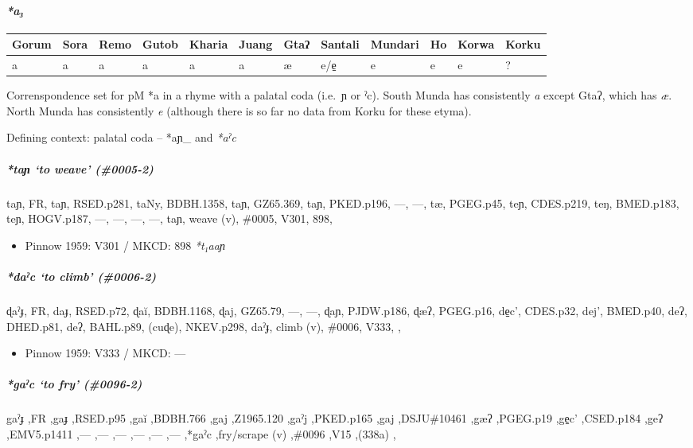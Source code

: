 \documentclass[a4paper,]{article}
\providecommand{\tightlist}{%
  \setlength{\itemsep}{0pt}\setlength{\parskip}{0pt}}
\let\oldparagraph\paragraph
\renewcommand{\paragraph}[1]{\oldparagraph{#1}\mbox{}}
\let\oldsubparagraph\subparagraph
\renewcommand{\subparagraph}[1]{\oldsubparagraph{#1}\mbox{}}
\begin{document}
\paragraph{\texorpdfstring{\emph{*a₃}}{*a₃}}\label{a-2}

\begin{longtable}[]{@{}llllllllllll@{}}
\toprule
Gorum & Sora & Remo & Gutob & Kharia & Juang & Gtaʔ & Santali & Mundari
& Ho & Korwa & Korku\tabularnewline
\midrule
\endhead
a & a & a & a & a & a & æ & e/e̠ & e & e & e & ?\tabularnewline
\bottomrule
\end{longtable}

Correnspondence set for pM *a in a rhyme with a palatal coda (i.e.~ɲ or
ˀc). South Munda has consistently \emph{a} except Gtaʔ, which has
\emph{æ}. North Munda has consistently \emph{e} (although there is so
far no data from Korku for these etyma).

Defining context: palatal coda -- *aɲ\_ and \emph{*aˀc}

\subparagraph{\texorpdfstring{\emph{*taɲ} `to weave'
(\#0005-2)}{*taɲ to weave (\#0005-2)}}\label{taux272-to-weave-0005-2}

taɲ, FR, taɲ, RSED.p281, taNy, BDBH.1358, taɲ, GZ65.369, taɲ, PKED.p196,
---, ---, tæ, PGEG.p45, teɲ, CDES.p219, teŋ, BMED.p183, teɲ, HOGV.p187,
---, ---, ---, ---, taɲ, weave (v), \#0005, V301, 898,

\begin{itemize}
\tightlist
\item
  Pinnow 1959: V301 / MKCD: 898 \emph{*t₁aaɲ}
\end{itemize}

\subparagraph{\texorpdfstring{\emph{*daˀc} `to climb'
(\#0006-2)}{*daˀc to climb (\#0006-2)}}\label{daux2c0c-to-climb-0006-2}

ɖaˀɟ, FR, daɟ, RSED.p72, ɖaĭ, BDBH.1168, ɖaj, GZ65.79, ---, ---, ɖaɲ,
PJDW.p186, ɖæʔ, PGEG.p16, de̠c', CDES.p32, dej', BMED.p40, deʔ, DHED.p81,
deʔ, BAHL.p89, (cuɖe), NKEV.p298, daˀɟ, climb (v), \#0006, V333, ,

\begin{itemize}
\tightlist
\item
  Pinnow 1959: V333 / MKCD: ---
\end{itemize}

\subparagraph{\texorpdfstring{\emph{*gaˀc} `to fry'
(\#0096-2)}{*gaˀc to fry (\#0096-2)}}\label{gaux2c0c-to-fry-0096-2}

gaˀɟ ,FR ,gaɟ ,RSED.p95 ,gaĭ ,BDBH.766 ,gaj ,Z1965.120 ,gaˀj ,PKED.p165
,gaj ,DSJU\#10461 ,gæʔ ,PGEG.p19 ,ge̠c' ,CSED.p184 ,geʔ ,EMV5.p1411 ,---
,--- ,--- ,--- ,--- ,--- ,*gaˀc ,fry/scrape (v) ,\#0096 ,V15 ,(338a) ,
\end{document}
